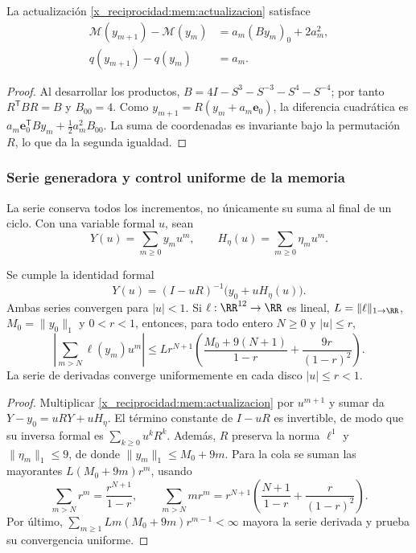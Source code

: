 \begin{proposition}
\label{x_reciprocidad:mem:prop-balance}
La actualización \eqref{x_reciprocidad:mem:actualizacion} satisface
\begin{equation}
 \begin{aligned}
 \mathcal M(y_{m+1})-\mathcal M(y_m)
   &=a_m(By_m)_0+2a_m^2,\\
 q(y_{m+1})-q(y_m)&=a_m.
 \end{aligned}
 \label{x_reciprocidad:mem:balance}
\end{equation}
\end{proposition}
\begin{proof}
Al desarrollar los productos,
\(B=4I-S^3-S^{-3}-S^4-S^{-4}\); por tanto
\(R^{\mathsf T}BR=B\) y \(B_{00}=4\).
Como \(y_{m+1}=R(y_m+a_m\mathbf e_0)\), la diferencia cuadrática
es \(a_m\mathbf e_0^{\mathsf T}By_m+\tfrac12a_m^2B_{00}\).
La suma de coordenadas es invariante bajo la permutación \(R\),
lo que da la segunda igualdad.
\end{proof}

\subsubsection{Serie generadora y control uniforme de la memoria}

La serie conserva todos los incrementos, no únicamente su suma al final
de un ciclo. Con una variable formal \(u\), sean
\[
 Y(u)=\sum_{m\geq0}y_mu^m,\qquad
 H_\eta(u)=\sum_{m\geq0}\eta_mu^m.
\]

\begin{proposition}
\label{x_reciprocidad:mem:prop-serie}
Se cumple la identidad formal
\begin{equation}
 Y(u)=(I-uR)^{-1}\bigl(y_0+uH_\eta(u)\bigr).
 \label{x_reciprocidad:mem:serie}
\end{equation}
Ambas series convergen para \(|u|<1\). Si \(\ell:\RR^{12}\to\RR\)
es lineal, \(L=\|\ell\|_{1\to\RR}\), \(M_0=\|y_0\|_1\) y
\(0<r<1\), entonces, para todo entero \(N\geq0\) y \(|u|\leq r\),
\begin{equation}
 \left|\sum_{m>N}\ell(y_m)u^m\right|
 \leq Lr^{N+1}\left(
 \frac{M_0+9(N+1)}{1-r}+\frac{9r}{(1-r)^2}\right).
 \label{x_reciprocidad:mem:cota}
\end{equation}
La serie de derivadas converge uniformemente en cada disco
\(|u|\leq r<1\).
\end{proposition}
\begin{proof}
Multiplicar \eqref{x_reciprocidad:mem:actualizacion} por \(u^{m+1}\) y sumar da
\(Y-y_0=uRY+uH_\eta\). El término constante de \(I-uR\) es
invertible, de modo que su inversa formal es \(\sum_{k\geq0}u^kR^k\).
Además, \(R\) preserva la norma \(\ell^1\) y
\(\|\eta_m\|_1\leq9\), de donde
\(\|y_m\|_1\leq M_0+9m\).
Para la cola se suman las mayorantes
\(L(M_0+9m)r^m\), usando
\[
 \sum_{m>N}r^m=\frac{r^{N+1}}{1-r},\qquad
 \sum_{m>N}mr^m=r^{N+1}
 \left(\frac{N+1}{1-r}+\frac r{(1-r)^2}\right).
\]
Por último, \(\sum_{m\geq1}Lm(M_0+9m)r^{m-1}<\infty\)
mayora la serie derivada y prueba su convergencia uniforme.
\end{proof}

